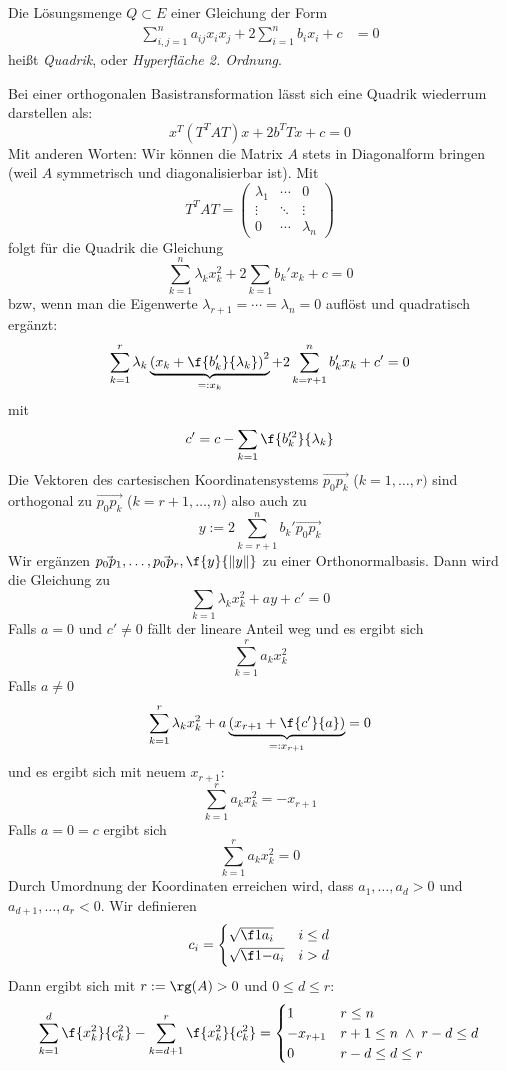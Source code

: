 \documentclass[a4paper, 10pt]{scrbook}
\begin{document}
\begin{df}
	\label{df:14.2}
	Die Lösungsmenge $Q\subset E$ einer Gleichung der Form
	\begin{align*}
		\sum_{i,j=1}^n a_{ij}x_ix_j + 2 \sum_{i=1}^n b_i x_i + c &= 0
	\end{align*}
	heißt \emph{Quadrik}, oder \emph{Hyperfläche 2. Ordnung}.
\end{df}

Bei einer orthogonalen Basistransformation lässt sich eine Quadrik wiederrum darstellen als:
\[
	x^T(T^TAT)x + 2b^TTx + c = 0
\]
Mit anderen Worten: Wir können die Matrix $A$ stets in Diagonalform bringen (weil $A$ symmetrisch und diagonalisierbar ist).
Mit
\[
	T^TAT = \begin{pmatrix}\lambda_1 & \cdots & 0\\ \vdots & \ddots & \vdots \\ 0 & \cdots & \lambda_n\end{pmatrix}
\]
folgt für die Quadrik die Gleichung
\[
	\sum_{k=1}^n \lambda_kx_k^2 + 2\sum_{k=1}b_k'x_k + c = 0
\]
bzw, wenn man die Eigenwerte $\lambda_{r+1}=\dotsb=\lambda_n=0$ auflöst und quadratisch ergänzt:
\[
	\sum_{k=1}^r \lambda_k\underbrace{\left(x_k + \f{b_k'}{\lambda_k}\right)^2}_{=: x_k} + 2\sum_{k=r+1}^n b_k'x_{k} + c' = 0
\]
mit
\[
	c' = c - \sum_{k=1}\f{b_k'^2}{\lambda_k}
\]
Die Vektoren des cartesischen Koordinatensystems $\vec{p_0p_k}$ ($k=1,\dotsc,r)$ sind orthogonal zu $\vec{p_0p_{k}}$ ($k=r+1,\dotsc, n$) also auch zu
\[
	y := 2\sum_{k=r+1}^n b_{k}'\vec{p_0p_{k}}
\]
Wir ergänzen $\vec{p_0p_1},\dotsc, \vec{p_0p_r}, \f {y}{\|y\|}$ zu einer Orthonormalbasis.
Dann wird die Gleichung zu
\[
	\sum_{k=1}\lambda_kx_k^2 + ay + c' = 0
\]
Falls $a=0$ und $c' \neq 0$ fällt der lineare Anteil weg und es ergibt sich
\[
	\sum_{k=1}^r a_kx_k^2 
\]
Falls $a\neq 0$
\[
	\sum_{k=1}^r \lambda_kx_k^2 + a\underbrace{\left(x_{r+1} + \f {c'}{a}\right)}_{=:x_{r+1}} = 0
\]
und es ergibt sich mit neuem $x_{r+1}$:
\[
	\sum_{k=1}^r a_kx_k^2 = -x_{r+1}
\]
Falls $a=0=c$ ergibt sich
\[
	\sum_{k=1}^r a_kx_k^2 = 0
\]
Durch Umordnung der Koordinaten erreichen wird, dass $a_1,\dots,a_d > 0$ und $a_{d+1},\dotsc, a_r < 0$.
Wir definieren
\[
	c_i = \begin{cases} \sqrt{\f 1{a_i}} & i \le d\\ \sqrt{\f 1{-a_i}} & i > d\end{cases}
\]
Dann ergibt sich mit $r:= \rg(A) >0$ und $0\le d \le r$:
\[
	\sum_{k=1}^d\f{x_k^2}{c_k^2} - \sum_{k=d+1}^r \f{x_{k}^2}{c_k^2} = \begin{cases}
		1 & r \le n\\
		-x_{r+1} & r+1 \le n \;\land\; r-d \le d\\
		0 & r-d \le d \le r
	\end{cases}
\]
\end{document}
